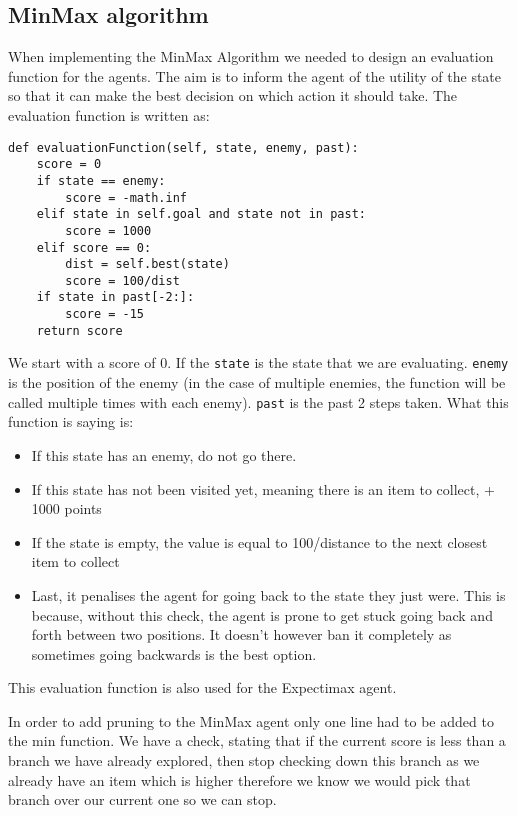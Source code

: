 \documentclass[]{final_report}
\begin{document}
\subsection{MinMax algorithm}

When implementing the MinMax Algorithm we needed to design an evaluation function for the agents. The aim is to inform the agent of the utility of the state so that it can make the best decision on which action it should take. The evaluation function is written as:

\begin{verbatim}
def evaluationFunction(self, state, enemy, past):
    score = 0
    if state == enemy:
        score = -math.inf
    elif state in self.goal and state not in past:
        score = 1000
    elif score == 0:
        dist = self.best(state)
        score = 100/dist
    if state in past[-2:]:
        score = -15
    return score
\end{verbatim}

We start with a score of 0. If the \verb|state| is the state that we are evaluating. \verb|enemy| is the position of the enemy (in the case of multiple enemies, the function will be called multiple times with each enemy). \verb|past| is the past 2 steps taken. What this function is saying is:
\begin{itemize}
    \item If this state has an enemy, do not go there.
    \item If this state has not been visited yet, meaning there is an item to collect, + 1000 points
    \item If the state is empty, the value is equal to 100/distance to the next closest item to collect
    \item Last, it penalises the agent for going back to the state they just were. This is because, without this check, the agent is prone to get stuck going back and forth between two positions. It doesn't however ban it completely as sometimes going backwards is the best option. 
\end{itemize}

This evaluation function is also used for the Expectimax agent.

In order to add pruning to the MinMax agent only one line had to be added to the min function. We have a check, stating that if the current score is less than a branch we have already explored, then stop checking down this branch as we already have an item which is higher therefore we know we would pick that branch over our current one so we can stop. 
\end{document}
